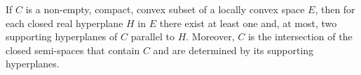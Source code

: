 If $C$ is a non-empty, compact, convex subset of a locally convex space $E$, then for each closed real hyperplane $H$ in $E$ there exist at least one and, at most, two supporting hyperplanes of $C$ parallel to $H$. Moreover, $C$ is the intersection of the closed semi-spaces that contain $C$ and are determined by its supporting hyperplanes.

